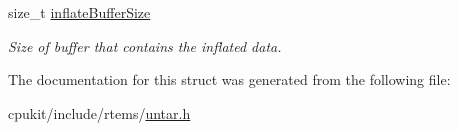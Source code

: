 \begin{DoxyCompactItemize}
\mbox{\label{structUntar__XzChunkContext_a996cbbf1862869b3d6c91c0484dd36fd}} 
size\+\_\+t \mbox{\hyperlink{structUntar__XzChunkContext_a996cbbf1862869b3d6c91c0484dd36fd}{inflate\+Buffer\+Size}}
\begin{DoxyCompactList}\small\item\em Size of buffer that contains the inflated data. \end{DoxyCompactList}\end{DoxyCompactItemize}


The documentation for this struct was generated from the following file\+:\begin{DoxyCompactItemize}
\item 
cpukit/include/rtems/\mbox{\hyperlink{untar_8h}{untar.\+h}}\end{DoxyCompactItemize}
